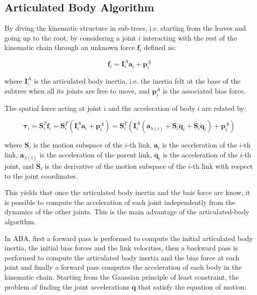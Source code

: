 \subsection{Articulated Body Algorithm}

By diving the kinematic structure in sub-trees, i.e. starting from the leaves and going up to the root, by considering a joint $i$ interacting with the rest of the kinematic chain through an unknown force $\mathbf{f} _i$ defined as:

\begin{equation}
    \mathbf{f} _i = \mathbf{I} _i ^A \mathbf{a} _i + \mathbf{p} ^A _i
\end{equation}

where $\mathbf{I} _i ^A$ is the articulated body inertia, i.e. the inertia felt at the base of the subtree when all its joints are free to move, and $\mathbf{p} ^A _i$ is the associated bias force.

The spatial force acting at joint $i$ and the acceleration of body $i$ are related by:

\begin{equation}
    \boldsymbol{\tau} _i = \mathbf{S} ^T _i \mathbf{f} _i = \mathbf{S} ^T _i (\mathbf{I} _i ^A \mathbf{a} _i + \mathbf{p} ^A _i) = \mathbf{S} ^T _i (\mathbf{I} _i ^A (\mathbf{a} _{\lambda(i)} + \mathbf{S} _i \ddot{\mathbf{q}} _i + \dot{\mathbf{S}} _i \dot{\mathbf{q}} _i)+ \mathbf{p} ^A _i)
\end{equation}

where $\mathbf{S} _i$ is the motion subspace of the $i$-th link, $\mathbf{a} _i$ is the acceleration of the $i$-th link, $\mathbf{a} _{\lambda(i)}$ is the acceleration of the parent link, $\ddot{\mathbf{q}} _i$ is the acceleration of the $i$-th joint, and $\dot{\mathbf{S}} _i$ is the derivative of the motion subspace of the $i$-th link with respect to the joint coordinates.

This yields that once the articulated body inertia and the bais force are know, it is possible to compute the acceleration of each joint independently from the dynamics of the other joints. This is the main advantage of the articulated-body algorithm.

In ABA, first a forward pass is performed to compute the initial articulated body inertia, the initial bias forces and the link velocities, then a backward pass is performed to compute the articulated body inertia and the bias force at each joint and finally a forward pass computes the acceleration of each body in the kinematic chain.
Starting from the Gaussian principle of least constraint, the problem of finding the joint accelerations $\ddot{\mathbf{q}}$ that satisfy the equation of motion:

